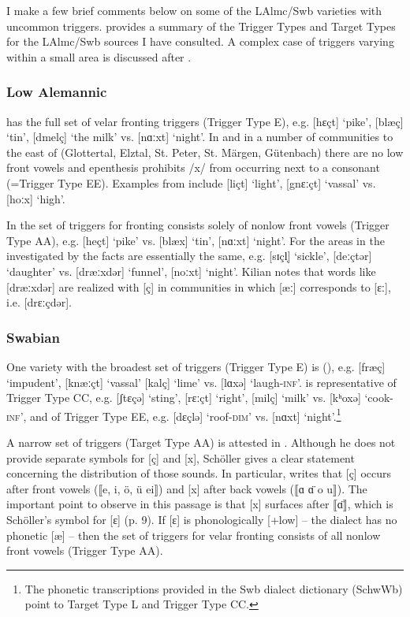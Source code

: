 I make a few brief comments below on some of the LAlmc/Swb varieties with uncommon triggers.  provides a summary of the Trigger Types and Target Types for the LAlmc/Swb sources I have consulted. A complex case of triggers varying within a small area is discussed after .

\subsubsection{Low Alemannic}
 has the full set of velar fronting triggers (Trigger Type E), e.g. [hɛçt] ‘pike’, [blæç] ‘tin’, [dmelç] ‘the milk’ vs. [nɑːxt] ‘night’. In  and in a number of communities to the east of  (Glottertal, Elztal, St. Peter, St. Märgen, Gütenbach) there are no low front vowels and epenthesis prohibits /x/ from occurring next to a consonant (=Trigger Type EE). Examples from  include [liçt] ‘light’, [gnɛːçt] ‘vassal’ vs. [hoːx] ‘high’.

In  the set of triggers for fronting consists solely of nonlow front vowels (Trigger Type AA), e.g. [heçt] ‘pike’ vs. [blæx] ‘tin’, [nɑːxt] ‘night’. For the areas in the  investigated by \citet{Kilian1935} the facts are essentially the same, e.g. [sɪçl̩] ‘sickle’, [deːçtər] ‘daughter’ vs. [dræːxdər] ‘funnel’, [noːxt] ‘night’. Kilian notes that words like [dræːxdər] are realized with [ç] in communities in which [æː] corresponds to [ɛː], i.e. [drɛːçdər].

\subsubsection{Swabian}
One variety with the broadest set of triggers (Trigger Type E) is  (), e.g. [fræç] ‘impudent’, [knæːçt] ‘vassal’ [kalç] ‘lime’ vs. [lɑxə] ‘laugh\textsc{{}-inf}’.  is representative of Trigger Type CC, e.g. [ʃtɛçə] ‘sting’, [rɛːçt] ‘right’, [milç] ‘milk’ vs. [kʰoxə] ‘cook\textsc{{}-inf}’, and  of Trigger Type EE, e.g. [dɛçlə] ‘roof-\textsc{dim}’ vs. [nɑxt] ‘night’.\footnote{{The phonetic transcriptions provided in the Swb dialect dictionary (SchwWb) point to Target Type L and Trigger Type CC.} }

A narrow set of triggers (Target Type AA) is attested in  \citep[49]{Schöller1939}. Although he does not provide separate symbols for [ç] and [x], Schöller gives a clear statement concerning the distribution of those sounds. In particular, \citet[49]{Schöller1939} writes that [ç] occurs after front vowels (⟦e, i, ö, ü ei⟧) and [x] after back vowels (⟦ɑ ɑ̈ o u⟧). The important point to observe in this passage is that [x] surfaces after ⟦ɑ̈⟧, which is Schöller’s symbol for [ɛ] (p. 9). If [ɛ] is phonologically [+low] -- the dialect has no phonetic [æ] -- then the set of triggers for velar fronting consists of all nonlow front vowels (Trigger Type AA).

